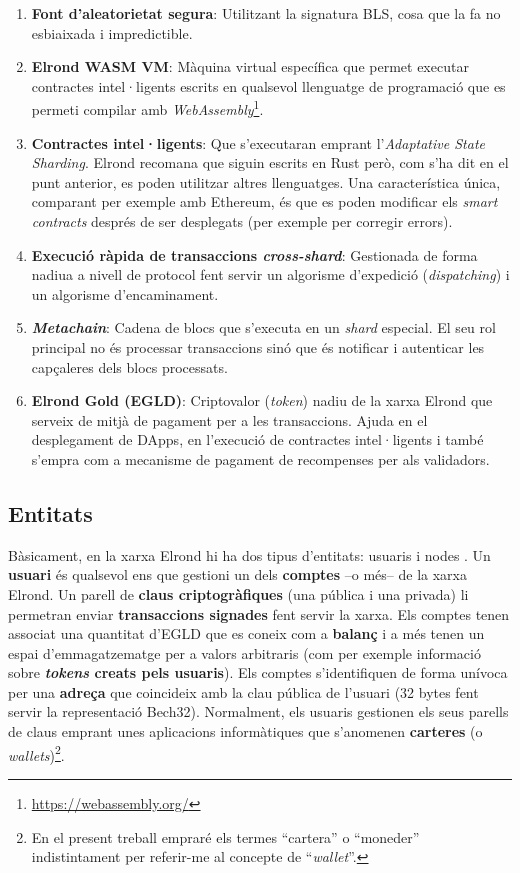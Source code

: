 \documentclass[11pt,a4paper]{article}
\begin{document}
\begin{enumerate}
  \item \textbf{Font d'aleatorietat segura}: Utilitzant la signatura BLS, cosa que la fa no esbiaixada i impredictible.
  \item \textbf{Elrond WASM VM}: Màquina virtual específica que permet executar contractes intel·ligents escrits en qualsevol llenguatge de programació que es permeti compilar amb  \textit{WebAssembly}\footnote{\url{https://webassembly.org/}}.
  \item \textbf{Contractes intel·ligents}: Que s'executaran emprant l'\textit{Adaptative State Sharding}. Elrond recomana que siguin escrits en Rust però, com s'ha dit en el punt anterior, es poden utilitzar altres llenguatges. Una característica única, comparant per exemple amb Ethereum, és que es poden modificar els \textit{smart contracts} després de ser desplegats \cite{cwirko01} (per exemple per corregir errors).
  \item \textbf{Execució ràpida de transaccions \textit{cross-shard}}: Gestionada de forma nadiua a nivell de protocol fent servir un algorisme d'expedició (\textit{dispatching}) i un algorisme d'encaminament.
   \item \textbf{\textit{Metachain}}: Cadena de blocs que s'executa en un \textit{shard} especial. El seu rol principal no és processar transaccions sinó que  és notificar i autenticar les capçaleres dels blocs processats.
   \item \textbf{Elrond Gold (EGLD)}: Criptovalor (\textit{token}) nadiu de la xarxa Elrond que serveix de mitjà de pagament per a les transaccions. Ajuda en el desplegament de DApps, en l'execució de contractes intel·ligents i també s'empra com a mecanisme de pagament de recompenses per als validadors. 
\end{enumerate}

\subsection{Entitats}
\label{sub:entitat}
Bàsicament, en la xarxa Elrond hi ha dos tipus d'entitats: usuaris i nodes \cite{elrond2022}. Un \textbf{usuari} és qualsevol ens que gestioni un dels \textbf{comptes} –o més– de la xarxa Elrond. Un parell de \textbf{claus criptogràfiques} (una pública i una privada) li permetran enviar \textbf{transaccions signades} fent servir la xarxa. Els comptes tenen associat una quantitat d'EGLD que es coneix com a \textbf{balanç} i a més tenen un espai d'emmagatzematge per a valors arbitraris (com per exemple informació sobre \textbf{\textit{tokens} creats pels usuaris}). Els comptes s'identifiquen de forma unívoca per una \textbf{adreça} que coincideix amb la clau pública de l'usuari (32 bytes fent servir la representació Bech32). Normalment, els usuaris gestionen els seus parells de claus emprant unes aplicacions informàtiques que s'anomenen \textbf{carteres} (o \textit{wallets})\footnote{En el present treball empraré els termes ``cartera'' o ``moneder'' indistintament per referir-me al concepte de ``\textit{wallet}''.}.
\end{document}
